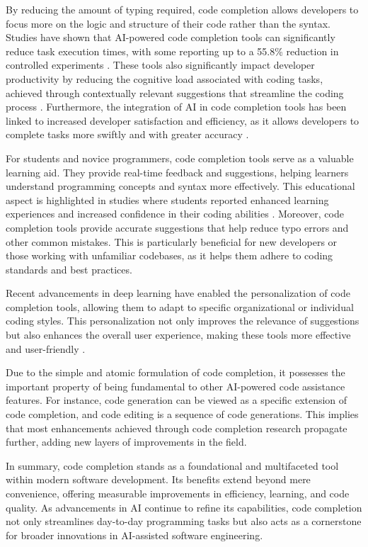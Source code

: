 By reducing the amount of typing required, code completion allows developers to focus more on the logic and structure of their code rather than the syntax. Studies have shown that AI-powered code completion tools can significantly reduce task execution times, with some reporting up to a 55.8\% reduction in controlled experiments \parencite{peng2023}. These tools also significantly impact developer productivity by reducing the cognitive load associated with coding tasks, achieved through contextually relevant suggestions that streamline the coding process \parencite{weber2024}. Furthermore, the integration of AI in code completion tools has been linked to increased developer satisfaction and efficiency, as it allows developers to complete tasks more swiftly and with greater accuracy \parencite{bakal2025}.

For students and novice programmers, code completion tools serve as a valuable learning aid. They provide real-time feedback and suggestions, helping learners understand programming concepts and syntax more effectively. This educational aspect is highlighted in studies where students reported enhanced learning experiences and increased confidence in their coding abilities \parencite{takerngsaksiri2024}. Moreover, code completion tools provide accurate suggestions that help reduce typo errors and other common mistakes. This is particularly beneficial for new developers or those working with unfamiliar codebases, as it helps them adhere to coding standards and best practices.

Recent advancements in deep learning have enabled the personalization of code completion tools, allowing them to adapt to specific organizational or individual coding styles. This personalization not only improves the relevance of suggestions but also enhances the overall user experience, making these tools more effective and user-friendly \parencite{giagnorio2025}.

Due to the simple and atomic formulation of code completion, it possesses the important property of being fundamental to other AI-powered code assistance features. For instance, code generation can be viewed as a specific extension of code completion, and code editing is a sequence of code generations. This implies that most enhancements achieved through code completion research propagate further, adding new layers of improvements in the field.

In summary, code completion stands as a foundational and multifaceted tool within modern software development. Its benefits extend beyond mere convenience, offering measurable improvements in efficiency, learning, and code quality. As advancements in AI continue to refine its capabilities, code completion not only streamlines day-to-day programming tasks but also acts as a cornerstone for broader innovations in AI-assisted software engineering.

